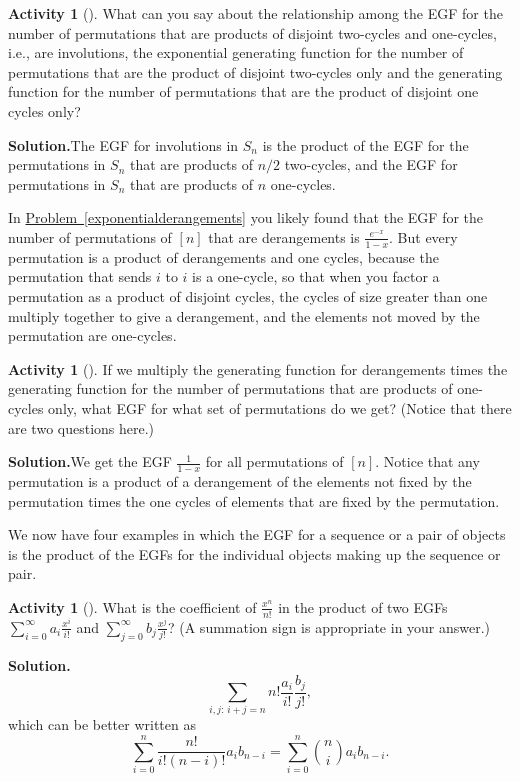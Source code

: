 \documentclass[10pt,]{book}
\theoremstyle{plain}
\theoremstyle{definition}
\newtheorem{activity}[project]{Activity}
\numberwithin{equation}{chapter}
\begin{document}
\begin{activity}[]\label{x2cyclesand1cycles}
What can you say about the relationship among the EGF for the number of permutations that are products of disjoint two-cycles and one-cycles, i.e., are involutions, the exponential generating function for the number of permutations that are the product of disjoint two-cycles only and the generating function for the number of permutations that are the product of disjoint one cycles only?%
\par\medskip\noindent%
\textbf{Solution.}\quad The EGF for involutions in \(S_n\) is the product of the EGF for the permutations in \(S_n\) that are products of \(n/2\) two-cycles, and the EGF for permutations in \(S_n\) that are products of \(n\) one-cycles.%
\end{activity}
In \hyperref[exponentialderangements]{Problem~\ref{exponentialderangements}} you likely found that the EGF for the number of permutations of \([n]\) that are derangements is \(\frac{e^{-x}}{1-x}\). But every permutation is a product of derangements and one cycles, because the permutation that sends \(i\) to \(i\) is a one-cycle, so that when you factor a permutation as a product of disjoint cycles, the cycles of size greater than one multiply together to give a derangement, and the elements not moved by the permutation are one-cycles.%
\begin{activity}[]\label{derangementsand1cycles}
If we multiply the generating function for derangements times the generating function for the number of permutations that are products of one-cycles only, what EGF for what set of permutations do we get? (Notice that there are two questions here.)%
\par\medskip\noindent%
\textbf{Solution.}\quad We get the EGF \(\frac{1}{1-x}\) for all permutations of \([n]\). Notice that any permutation is a product of a derangement of the elements not fixed by the permutation times the one cycles of elements that are fixed by the permutation.%
\end{activity}
We now have four examples in which the EGF for a sequence or a pair of objects is the product of the EGFs for the individual objects making up the sequence or pair.%
\begin{activity}[]\label{exponentialpp1}
What is the coefficient of \(\frac{x^n}{n!}\) in the product of two EGFs \(\sum_{i=0}^\infty a_i\frac{x^i}{i!}\) and \(\sum_{j=0}^\infty
b_j\frac{x^j}{j!}\)? (A summation sign is appropriate in your answer.)%
\par\medskip\noindent%
\textbf{Solution.}\quad %
\begin{equation*}
\sum_{i,j\mbox{:\ }
i+j=n} n!\frac{a_i}{i!}\frac{b_j}{j!},
\end{equation*}
which can be better written as%
\begin{equation*}
\sum_{i=0}^n\frac{n!}{i!(n-i)!} a_i
b_{n-i}=\sum_{i=0}^n\binom{n}{i} a_i b_{n-i}.
\end{equation*}
%
\end{activity}
\end{document}
